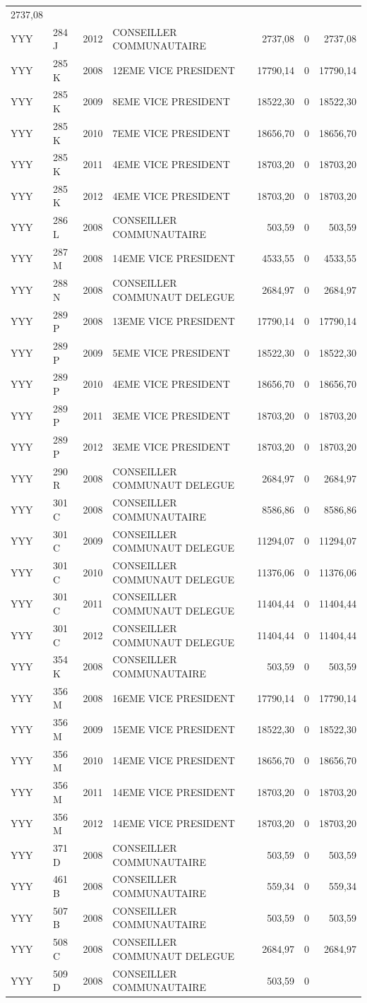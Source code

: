 \begin{longtable}[]{@{}llrlrrr@{}}
2737,08\tabularnewline
YYY & 284 J & 2012 & CONSEILLER COMMUNAUTAIRE & 2737,08 & 0 &
2737,08\tabularnewline
YYY & 285 K & 2008 & 12EME VICE PRESIDENT & 17790,14 & 0 &
17790,14\tabularnewline
YYY & 285 K & 2009 & 8EME VICE PRESIDENT & 18522,30 & 0 &
18522,30\tabularnewline
YYY & 285 K & 2010 & 7EME VICE PRESIDENT & 18656,70 & 0 &
18656,70\tabularnewline
YYY & 285 K & 2011 & 4EME VICE PRESIDENT & 18703,20 & 0 &
18703,20\tabularnewline
YYY & 285 K & 2012 & 4EME VICE PRESIDENT & 18703,20 & 0 &
18703,20\tabularnewline
YYY & 286 L & 2008 & CONSEILLER COMMUNAUTAIRE & 503,59 & 0 &
503,59\tabularnewline
YYY & 287 M & 2008 & 14EME VICE PRESIDENT & 4533,55 & 0 &
4533,55\tabularnewline
YYY & 288 N & 2008 & CONSEILLER COMMUNAUT DELEGUE & 2684,97 & 0 &
2684,97\tabularnewline
YYY & 289 P & 2008 & 13EME VICE PRESIDENT & 17790,14 & 0 &
17790,14\tabularnewline
YYY & 289 P & 2009 & 5EME VICE PRESIDENT & 18522,30 & 0 &
18522,30\tabularnewline
YYY & 289 P & 2010 & 4EME VICE PRESIDENT & 18656,70 & 0 &
18656,70\tabularnewline
YYY & 289 P & 2011 & 3EME VICE PRESIDENT & 18703,20 & 0 &
18703,20\tabularnewline
YYY & 289 P & 2012 & 3EME VICE PRESIDENT & 18703,20 & 0 &
18703,20\tabularnewline
YYY & 290 R & 2008 & CONSEILLER COMMUNAUT DELEGUE & 2684,97 & 0 &
2684,97\tabularnewline
YYY & 301 C & 2008 & CONSEILLER COMMUNAUTAIRE & 8586,86 & 0 &
8586,86\tabularnewline
YYY & 301 C & 2009 & CONSEILLER COMMUNAUT DELEGUE & 11294,07 & 0 &
11294,07\tabularnewline
YYY & 301 C & 2010 & CONSEILLER COMMUNAUT DELEGUE & 11376,06 & 0 &
11376,06\tabularnewline
YYY & 301 C & 2011 & CONSEILLER COMMUNAUT DELEGUE & 11404,44 & 0 &
11404,44\tabularnewline
YYY & 301 C & 2012 & CONSEILLER COMMUNAUT DELEGUE & 11404,44 & 0 &
11404,44\tabularnewline
YYY & 354 K & 2008 & CONSEILLER COMMUNAUTAIRE & 503,59 & 0 &
503,59\tabularnewline
YYY & 356 M & 2008 & 16EME VICE PRESIDENT & 17790,14 & 0 &
17790,14\tabularnewline
YYY & 356 M & 2009 & 15EME VICE PRESIDENT & 18522,30 & 0 &
18522,30\tabularnewline
YYY & 356 M & 2010 & 14EME VICE PRESIDENT & 18656,70 & 0 &
18656,70\tabularnewline
YYY & 356 M & 2011 & 14EME VICE PRESIDENT & 18703,20 & 0 &
18703,20\tabularnewline
YYY & 356 M & 2012 & 14EME VICE PRESIDENT & 18703,20 & 0 &
18703,20\tabularnewline
YYY & 371 D & 2008 & CONSEILLER COMMUNAUTAIRE & 503,59 & 0 &
503,59\tabularnewline
YYY & 461 B & 2008 & CONSEILLER COMMUNAUTAIRE & 559,34 & 0 &
559,34\tabularnewline
YYY & 507 B & 2008 & CONSEILLER COMMUNAUTAIRE & 503,59 & 0 &
503,59\tabularnewline
YYY & 508 C & 2008 & CONSEILLER COMMUNAUT DELEGUE & 2684,97 & 0 &
2684,97\tabularnewline
YYY & 509 D & 2008 & CONSEILLER COMMUNAUTAIRE & 503,59 & 0 &

\end{longtable}
